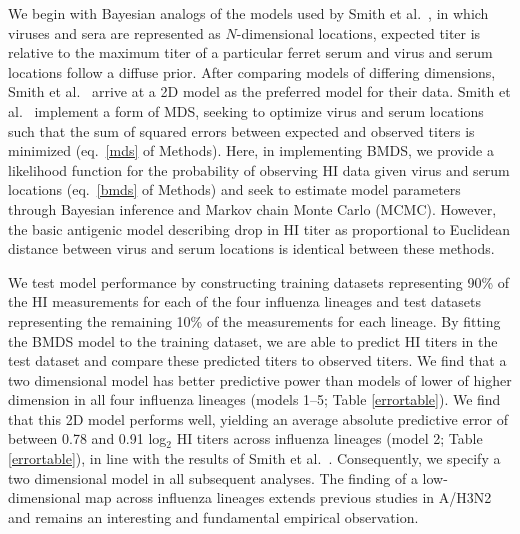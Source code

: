 \documentclass[11pt,oneside,letterpaper]{article}
\begin{document}
We begin with Bayesian analogs of the models used by Smith et al.\ \cite{Smith04}, in which viruses and sera are represented as $N$-dimensional locations, expected titer is relative to the maximum titer of a particular ferret serum and virus and serum locations follow a diffuse prior.
After comparing models of differing dimensions, Smith et al.\ \cite{Smith04} arrive at a 2D model as the preferred model for their data.
Smith et al.\ \cite{Smith04} implement a form of MDS, seeking to optimize virus and serum locations such that the sum of squared errors between expected and observed titers is minimized (eq.\ \ref{mds} of Methods).
Here, in implementing BMDS, we provide a likelihood function for the probability of observing HI data given virus and serum locations (eq.\ \ref{bmds} of Methods) and seek to estimate model parameters through Bayesian inference and Markov chain Monte Carlo (MCMC).
However, the basic antigenic model describing drop in HI titer as proportional to Euclidean distance between virus and serum locations is identical between these methods.

We test model performance by constructing training datasets representing 90\% of the HI measurements for each of the four influenza lineages and test datasets representing the remaining 10\% of the measurements for each lineage. 
By fitting the BMDS model to the training dataset, we are able to predict HI titers in the test dataset and compare these predicted titers to observed titers.
We find that a two dimensional model has better predictive power than models of lower of higher dimension in all four influenza lineages (models 1--5; Table \ref{errortable}).
We find that this 2D model performs well, yielding an average absolute predictive error of between 0.78 and 0.91 log$_2$ HI titers across influenza lineages (model 2; Table \ref{errortable}), in line with the results of Smith et al.\ \cite{Smith04}.
Consequently, we specify a two dimensional model in all subsequent analyses.
The finding of a low-dimensional map across influenza lineages extends previous studies in A/H3N2 \cite{Smith04} and remains an interesting and fundamental empirical observation.
\end{document}
